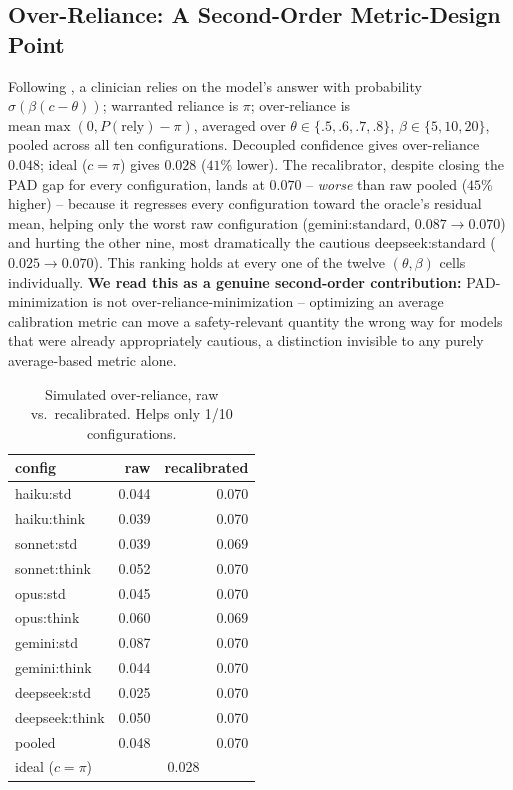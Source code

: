 \documentclass[letterpaper]{article} %
\begin{document}
\subsection{Over-Reliance: A Second-Order Metric-Design Point}
\label{sec:reliance}
Following \citet{lee2004trust}, a clinician relies on the model's answer
with probability $\sigma(\beta(c-\theta))$; warranted reliance is $\pi$;
over-reliance is $\mathrm{mean}\max(0,P(\mathrm{rely})-\pi)$, averaged over
$\theta\in\{.5,.6,.7,.8\}$, $\beta\in\{5,10,20\}$, pooled across all ten
configurations. Decoupled confidence gives over-reliance $0.048$; ideal
($c{=}\pi$) gives $0.028$ ($41\%$ lower). The recalibrator, despite closing
the PAD gap for every configuration, lands at $\mathbf{0.070}$ --
\emph{worse} than raw pooled ($45\%$ higher) -- because it regresses every
configuration toward the oracle's residual mean, helping only the worst raw
configuration (gemini:standard, $0.087{\to}0.070$) and hurting the other
nine, most dramatically the cautious deepseek:standard
($0.025{\to}0.070$). This ranking holds at every one of the twelve
$(\theta,\beta)$ cells individually. \textbf{We read this as a genuine
second-order contribution:} PAD-minimization is not
over-reliance-minimization -- optimizing an average calibration metric can
move a safety-relevant quantity the wrong way for models that were already
appropriately cautious, a distinction invisible to any purely average-based
metric alone.

\begin{table}[t]
\centering
\small
\begin{tabular}{lrr}
\toprule
config & raw & recalibrated \\
\midrule
haiku:std    & 0.044 & 0.070 \\
haiku:think  & 0.039 & 0.070 \\
sonnet:std   & 0.039 & 0.069 \\
sonnet:think & 0.052 & 0.070 \\
opus:std     & 0.045 & 0.070 \\
opus:think   & 0.060 & 0.069 \\
gemini:std   & 0.087 & 0.070 \\
gemini:think & 0.044 & 0.070 \\
deepseek:std & 0.025 & 0.070 \\
deepseek:think & 0.050 & 0.070 \\
\midrule
pooled            & 0.048 & 0.070 \\
ideal ($c=\pi$)   & \multicolumn{2}{c}{0.028} \\
\bottomrule
\end{tabular}
\caption{Simulated over-reliance, raw vs.\ recalibrated. Helps only 1/10 configurations.}
\label{tab:reliance}
\end{table}
\end{document}
